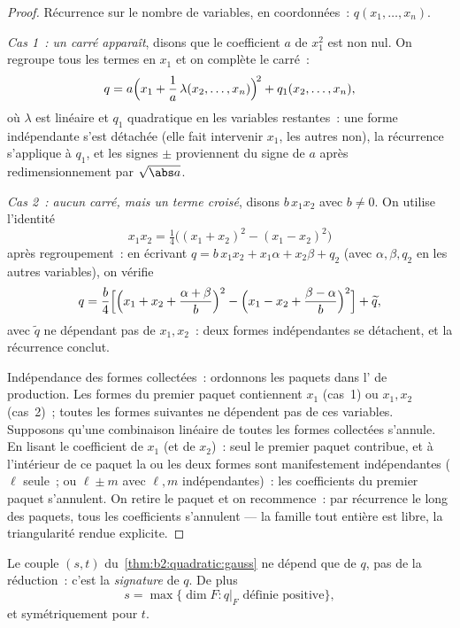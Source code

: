 \begin{proof}
Récurrence sur le nombre de variables, en coordonnées~: $q(x_1,
\dots, x_n)$.

\emph{Cas 1~: un carré apparaît}, disons que le coefficient $a$ de
$x_1^2$ est non nul. On regroupe tous les termes en $x_1$ et on
complète le carré~:
\[
q = a\Bigl(x_1 + \frac{1}{a}\,\lambda(x_2, \dots,
x_n)\Bigr)^{\!2} + q_1(x_2, \dots, x_n),
\]
où $\lambda$ est linéaire et $q_1$ quadratique en les variables
restantes~: une forme indépendante s'est détachée (elle fait
intervenir $x_1$, les autres non), la récurrence s'applique à
$q_1$, et les signes $\pm$ proviennent du signe de $a$ après
redimensionnement par $\sqrt{\abs a}$.

\emph{Cas 2~: aucun carré, mais un terme croisé}, disons
$b\,x_1x_2$ avec $b \neq 0$. On utilise l'identité
\[
x_1x_2 = \tfrac14\bigl((x_1 + x_2)^2 - (x_1 - x_2)^2\bigr)
\]
après regroupement~: en écrivant $q = b\,x_1x_2 + x_1\alpha +
x_2\beta + q_2$ (avec $\alpha, \beta, q_2$ en les autres variables),
on vérifie
\[
q = \frac{b}{4}\Bigl[\Bigl(x_1 + x_2 + \frac{\alpha +
\beta}{b}\Bigr)^{2} - \Bigl(x_1 - x_2 + \frac{\beta -
\alpha}{b}\Bigr)^{2}\Bigr] + \widetilde q ,
\]
avec $\widetilde q$ ne dépendant pas de $x_1, x_2$~: deux formes
indépendantes se détachent, et la récurrence conclut.

Indépendance des formes collectées~: ordonnons les paquets dans
l' de production. Les formes du premier paquet contiennent
$x_1$ (cas~1) ou $x_1, x_2$ (cas~2)~; toutes les formes suivantes ne
dépendent pas de ces variables. Supposons qu'une combinaison
linéaire de toutes les formes collectées s'annule. En lisant le
coefficient de $x_1$ (et de $x_2$)~: seul le premier paquet
contribue, et à l'intérieur de ce paquet la ou les deux formes sont
manifestement indépendantes ($\ell$ seule~; ou $\ell \pm m$ avec
$\ell, m$ indépendantes)~: les coefficients du premier paquet
s'annulent. On retire le paquet et on recommence~: par récurrence le
long des paquets, tous les coefficients s'annulent --- la famille
tout entière est libre, la triangularité rendue explicite.
\end{proof}

\begin{theorem}\label{thm:b2:quadratic:sylvester}
Le couple $(s, t)$ du~\cref{thm:b2:quadratic:gauss} ne dépend que de
$q$, pas de la réduction~: c'est la
\emph{signature} de $q$.
De plus
\[
s = \max\{\dim F : q|_F \text{ définie positive}\},
\]
et symétriquement pour $t$.
\end{theorem}

